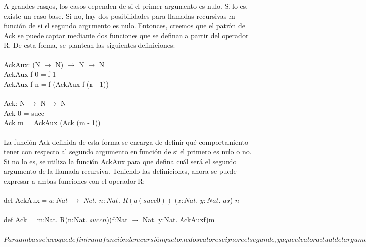 \documentclass{article}
\begin{document}
	A grandes rasgos, los casos dependen de si el primer argumento es nulo. Si lo es, existe un caso base. Si no, hay dos posibilidades para llamadas recursivas en función de si el segundo argumento es nulo. Entonces, creemos que el patrón de Ack se puede captar mediante dos funciones que se definan a partir del operador R. De esta forma, se plantean las siguientes definiciones:
	\\
	\\
	AckAux: (N $\rightarrow$ N) $\rightarrow$ N $\rightarrow$ N\\
	AckAux f 0 = f 1\\
	AckAux f n = f (AckAux f (n - 1))\\
	\\
	Ack: N $\rightarrow$ N $\rightarrow$ N\\
	Ack 0 = succ\\
	Ack m = AckAux (Ack (m - 1))\\
	\\
	La función Ack definida de esta forma se encarga de definir qué comportamiento tener con respecto al segundo argumento en función de si el primero es nulo o no. Si no lo es, se utiliza la función AckAux para que defina cuál será el segundo argumento de la llamada recursiva. Teniendo las definiciones, ahora se puede expresar a ambas funciones con el operador R:
	\\
	\\
	def AckAux = \lambda $a : Nat$ $\rightarrow$ $Nat.$ \lambda $n : Nat.$ $R (a (succ 0)) $ (\lambda $x : Nat.$ \lambda $y : Nat.$ $a x$) $ n$ \\ \\
	def Ack = \lambda m:Nat. R$ $(\lambda n:Nat. $succ n$)$ $(\lambda f:Nat $\rightarrow$ Nat. \lambda y:Nat. AckAux$ $f)$ $m\\
	\\
	$Para ambas se tuvo que definir una función de recursión que tome dos valores e ignore el segundo, ya que el valor actual del argumento no es necesario en el cálculo del resultado, sólo lo que devuelva la llamada recursiva.$

		\newpage
\end{document}

